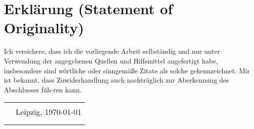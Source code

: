 \section*{Erklärung (Statement of Originality)}\label{erklaerung}

Ich versichere, dass ich die vorliegende Arbeit selbständig und nur
unter Verwendung der angegebenen Quellen und Hilfsmittel angefertigt
habe, insbesondere sind wörtliche oder sinngemäße Zitate als solche
gekennzeichnet. Mir ist bekannt, dass Zuwiderhandlung auch nachträglich
zur Aberkennung des Abschlusses füh-ren kann.\vspace{3em}

\begin{tabular}{c l}
    \rule{.4\textwidth}{.4pt} & Leipzig, \germanDate{}\today{} \\
    {\footnotesize\documentAuthor{}}       &
\end{tabular}